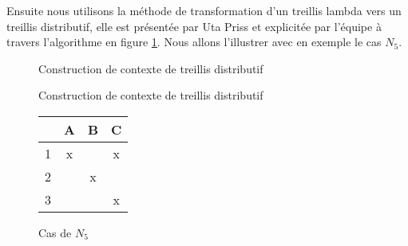 Ensuite nous utilisons la méthode de transformation d'un treillis lambda vers un treillis distributif, elle est présentée par Uta Priss et explicitée par l'équipe à travers l'algorithme en figure \ref{algo_cla}. Nous allons l'illustrer avec en exemple le cas $N_5$.

\begin{figure}[H]
\begin{algorithm}[H]
	\DontPrintSemicolon
	\caption{Construction de contexte de treillis distributif}


\end{algorithm}
\caption{Construction de contexte de treillis distributif}
\label{algo_cla}
\end{figure}

\begin{figure}[H]
	\begin{minipage}[c]{0.5\textwidth}
	\begin{center}
		\begin{tabular}{ l | c c c }
			 & A & B & C \\
			\hline
			1 & x & & x \\
			2 & & x & \\
			3 & & & x \\
		\end{tabular}
	\end{center}
	\end{minipage}
	\begin{minipage}[c]{0.5\textwidth}
	\begin{center}
	\end{center}
	\end{minipage}
	\caption{Cas de $N_5$}
\end{figure}

